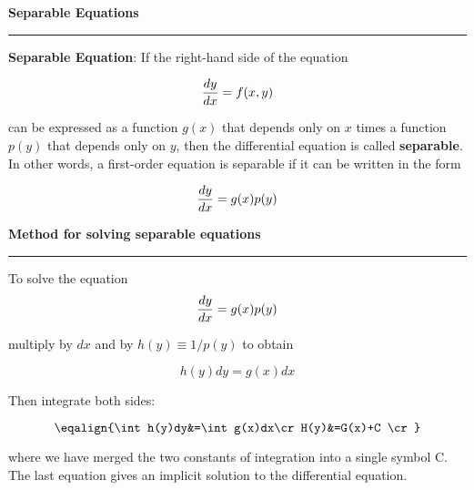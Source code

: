 \nopagenumbers
{\bf Separable Equations}
\vskip 1mm
\hrule

\vskip 6pt
{\bf Separable Equation}: If the right-hand side of the equation

$${dy\over dx}=f(x,y)$$

can be expressed as a function $g(x)$ that depends only on $x$ times a function $p(y)$ that depends only on $y$, then the differential equation is called {\bf separable}. In other words, a first-order equation is separable if it can be written in the form

$${dy\over dx}=g(x)p(y)$$

\vskip 6pt
{\bf Method for solving separable equations}
\vskip 1mm
\hrule

\vskip 6pt
To solve the equation
$${dy\over dx}=g(x)p(y)$$

multiply by $dx$ and by $h(y)\equiv 1/p(y)$ to obtain

$$h(y)dy=g(x)dx$$

Then integrate both sides:

$$\eqalign{\int h(y)dy&=\int g(x)dx\cr
		H(y)&=G(x)+C \cr}$$

where we have merged the two constants of integration into a single symbol C. The last equation gives an implicit solution to the differential equation.

\vfill\eject
\bye
